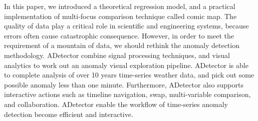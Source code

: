 \documentclass{vgtc}                          %
\begin{document}
In this paper, we introduced a theoretical regression model, and a practical implementation of multi-focus comparison technique called comic map. The quality of data play a critical role in scientific and engineering systems, because errors often cause catastrophic consequence. However, in order to meet the requirement of a mountain of data, we should rethink the anomaly detection methodology. ADetector combine signal processing techniques, and visual analytics to work out an anomaly visual exploration pipeline. ADetector is able to complete analysis of over 10 years time-series weather data, and pick out some possible anomaly less than one minute. Furthermore, ADetector also supports interactive actions such as timeline navigation, swap, multi-variable comparison, and collaboration. ADetector enable the workflow of time-series anomaly detection become efficient and interactive.





\end{document}
